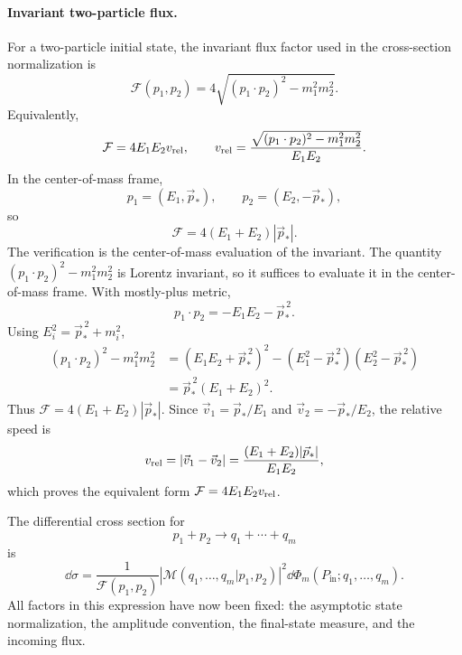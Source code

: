 \paragraph{Invariant two-particle flux.}
For a two-particle initial state, the invariant flux factor used in the
cross-section normalization is
\[
  \mathcal F(p_1,p_2)
  =
  4\sqrt{(p_1\cdot p_2)^2-m_1^2m_2^2}.
\]
Equivalently,
\[
  \mathcal F=4E_1E_2v_{\rm rel},
  \qquad
  v_{\rm rel}
  =
  \frac{\sqrt{(p_1\cdot p_2)^2-m_1^2m_2^2}}{E_1E_2}.
\]
In the center-of-mass frame,
\[
  p_1=(E_1,\vec p_*),
  \qquad
  p_2=(E_2,-\vec p_*),
\]
so
\[
  \mathcal F=4(E_1+E_2)|\vec p_*|.
\]
The verification is the center-of-mass evaluation of the invariant.  The
quantity
\((p_1\cdot p_2)^2-m_1^2m_2^2\) is Lorentz invariant, so it suffices to
evaluate it in the center-of-mass frame.  With mostly-plus metric,
\[
  p_1\cdot p_2=-E_1E_2-\vec p_*^{\,2}.
\]
Using \(E_i^2=\vec p_*^{\,2}+m_i^2\),
\[
\begin{aligned}
  (p_1\cdot p_2)^2-m_1^2m_2^2
  &=
  (E_1E_2+\vec p_*^{\,2})^2
  -(E_1^2-\vec p_*^{\,2})(E_2^2-\vec p_*^{\,2})  \\
  &=
  \vec p_*^{\,2}(E_1+E_2)^2 .
\end{aligned}
\]
Thus \(\mathcal F=4(E_1+E_2)|\vec p_*|\).  Since
\(\vec v_1=\vec p_*/E_1\) and \(\vec v_2=-\vec p_*/E_2\), the relative speed
is
\[
  v_{\rm rel}=|\vec v_1-\vec v_2|
  =
  \frac{(E_1+E_2)|\vec p_*|}{E_1E_2},
\]
which proves the equivalent form \(\mathcal F=4E_1E_2v_{\rm rel}\).

\begin{definition}
\label{def:differential-cross-section-invariant-data}
The differential cross section for
\[
  p_1+p_2\longrightarrow q_1+\cdots+q_m
\]
is
\[
  \dd\sigma
  =
  \frac{1}{\mathcal F(p_1,p_2)}
  \left|\mathcal M(q_1,\ldots,q_m|p_1,p_2)\right|^2
  \dd\Phi_m(P_{\mathrm{in}};q_1,\ldots,q_m).
\]
All factors in this expression have now been fixed: the asymptotic state
normalization, the amplitude convention, the final-state measure, and the
incoming flux.
\end{definition}

